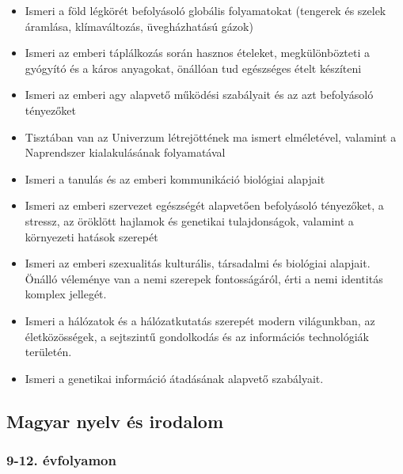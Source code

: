 \begin{itemize}
\item
  Ismeri a föld légkörét befolyásoló globális folyamatokat (tengerek és
  szelek áramlása, klímaváltozás, üvegházhatású gázok)
\item
  Ismeri az emberi táplálkozás során hasznos ételeket, megkülönbözteti a
  gyógyító és a káros anyagokat, önállóan tud egészséges ételt készíteni
\item
  Ismeri az emberi agy alapvető működési szabályait és az azt
  befolyásoló tényezőket
\item
  Tisztában van az Univerzum létrejöttének ma ismert elméletével,
  valamint a Naprendszer kialakulásának folyamatával
\item
  Ismeri a tanulás és az emberi kommunikáció biológiai alapjait
\item
  Ismeri az emberi szervezet egészségét alapvetően befolyásoló
  tényezőket, a stressz, az öröklött hajlamok és genetikai
  tulajdonságok, valamint a környezeti hatások szerepét
\item
  Ismeri az emberi szexualitás kulturális, társadalmi és biológiai
  alapjait. Önálló véleménye van a nemi szerepek fontosságáról, érti a
  nemi identitás komplex jellegét.
\item
  Ismeri a hálózatok és a hálózatkutatás szerepét modern világunkban, az
  életközösségek, a sejtszintű gondolkodás és az információs
  technológiák területén.
\item
  Ismeri a genetikai információ átadásának alapvető szabályait.
\end{itemize}

\hypertarget{magyar-nyelv-es-irodalom}{%
\subsection{Magyar nyelv és irodalom}\label{magyar-nyelv-es-irodalom}}

\hypertarget{evfolyamon-4}{%
\subsubsection{9-12. évfolyamon}\label{evfolyamon-4}}

